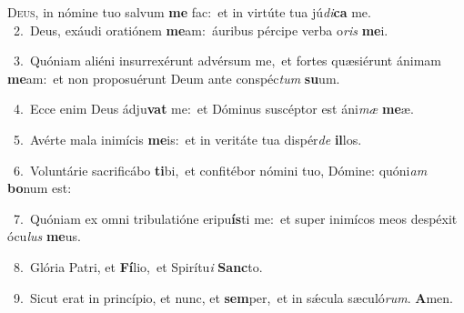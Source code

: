 \lettrine{\initial\textcolor{\initialcolor}{D}}{eus,} in nómine tuo salvum \textbf{me} fac:~\star et in virtúte tua jú\-\textit{di}\-\textbf{ca} me.\\
{\numbfont\textcolor{\numbcolor}{~2.}}~Deus, exáudi oratiónem \textbf{me}\-am:~\star áuribus pércipe verba o\textit{ris} \textbf{me}\-i.\par
{\numbfont\textcolor{\numbcolor}{~3.}}~Quóniam aliéni insurrexérunt advérsum me,~\dagger et fortes quæsiérunt ánimam \textbf{me}\-am:~\star et non proposuérunt Deum ante conspéc\textit{tum} \textbf{su}\-um.\par
{\numbfont\textcolor{\numbcolor}{~4.}}~Ecce enim Deus ádju\textbf{vat} me:~\star et Dóminus suscéptor est áni\textit{mæ} \textbf{me}\-æ.\par
{\numbfont\textcolor{\numbcolor}{~5.}}~Avérte mala inimícis \textbf{me}\-is:~\star et in veritáte tua dispér\textit{de} \textbf{il}\-los.\par
{\numbfont\textcolor{\numbcolor}{~6.}}~Voluntárie sacrificábo \textbf{ti}\-bi,~\star et confitébor nómini tuo, Dómine: quóni\textit{am} \textbf{bo}\-num est:\par
{\numbfont\textcolor{\numbcolor}{~7.}}~Quóniam ex omni tribulatióne eripu\-\textbf{ís}\-ti me:~\star et super inimícos meos despéxit ócu\textit{lus} \textbf{me}\-us.\par
{\numbfont\textcolor{\numbcolor}{~8.}}~Glória Patri, et \textbf{Fí}\-lio,~\star et Spirítu\textit{i} \textbf{Sanc}\-to.\par
{\numbfont\textcolor{\numbcolor}{~9.}}~Sicut erat in princípio, et nunc, et \textbf{sem}\-per,~\star et in sǽcula sæculó\-\textit{rum}\-. \textbf{A}\-men.\par

